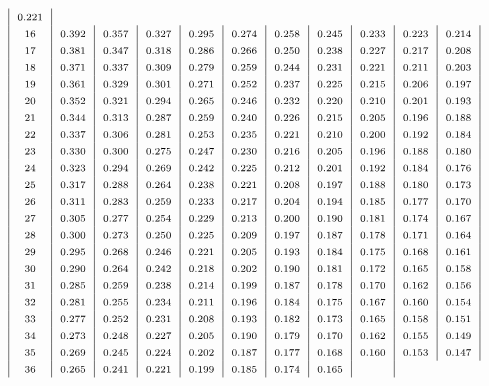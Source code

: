 $$\begin{tabular}{|>{\scriptsize}c|>{\scriptsize}c|>{\scriptsize}c|
>{\scriptsize}c|>{\scriptsize}c|>{\scriptsize}c|>{\scriptsize}c|
>{\scriptsize}c|>{\scriptsize}c|>{\scriptsize}c|>{\scriptsize}c|}
0.221\\           16&
0.392&
0.357&
0.327&
0.295&
0.274&
0.258&
0.245&
0.233&
0.223&
0.214\\           17&
0.381&
0.347&
0.318&
0.286&
0.266&
0.250&
0.238&
0.227&
0.217&
0.208\\           18&
0.371&
0.337&
0.309&
0.279&
0.259&
0.244&
0.231&
0.221&
0.211&
0.203\\           19&
0.361&
0.329&
0.301&
0.271&
0.252&
0.237&
0.225&
0.215&
0.206&
0.197\\           20&
0.352&
0.321&
0.294&
0.265&
0.246&
0.232&
0.220&
0.210&
0.201&
0.193 \\    21&
0.344&
0.313&
0.287&
0.259&
0.240&
0.226&
0.215&
0.205&
0.196&
0.188\\           22&
0.337&
0.306&
0.281&
0.253&
0.235&
0.221&
0.210&
0.200&
0.192&
0.184\\           23&
0.330&
0.300&
0.275&
0.247&
0.230&
0.216&
0.205&
0.196&
0.188&
0.180\\           24&
0.323&
0.294&
0.269&
0.242&
0.225&
0.212&
0.201&
0.192&
0.184&
0.176\\           25&
0.317&
0.288&
0.264&
0.238&
0.221&
0.208&
0.197&
0.188&
0.180&
0.173\\           26&
0.311&
0.283&
0.259&
0.233&
0.217&
0.204&
0.194&
0.185&
0.177&
0.170\\           27&
0.305&
0.277&
0.254&
0.229&
0.213&
0.200&
0.190&
0.181&
0.174&
0.167\\           28&
0.300&
0.273&
0.250&
0.225&
0.209&
0.197&
0.187&
0.178&
0.171&
0.164\\           29&
0.295&
0.268&
0.246&
0.221&
0.205&
0.193&
0.184&
0.175&
0.168&
0.161\\           30&
0.290&
0.264&
0.242&
0.218&
0.202&
0.190&
0.181&
0.172&
0.165&
0.158\\           31&
0.285&
0.259&
0.238&
0.214&
0.199&
0.187&
0.178&
0.170&
0.162&
0.156\\           32&
0.281&
0.255&
0.234&
0.211&
0.196&
0.184&
0.175&
0.167&
0.160&
0.154\\           33&
0.277&
0.252&
0.231&
0.208&
0.193&
0.182&
0.173&
0.165&
0.158&
0.151\\           34&
0.273&
0.248&
0.227&
0.205&
0.190&
0.179&
0.170&
0.162&
0.155&
0.149\\           35&
0.269&
0.245&
0.224&
0.202&
0.187&
0.177&
0.168&
0.160&
0.153&
0.147\\           36&
0.265&
0.241&
0.221&
0.199&
0.185&
0.174&
0.165&

\end{tabular}$$

